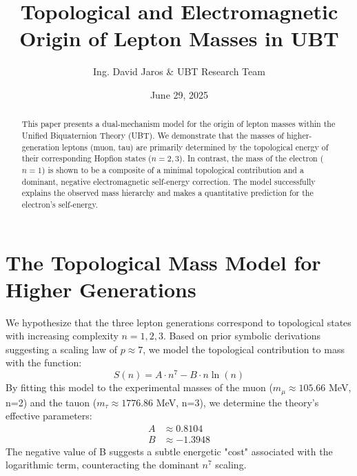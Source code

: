 \documentclass[12pt, a4paper]{article}
\title{\textbf{Topological and Electromagnetic Origin of Lepton Masses in UBT}}
\author{Ing. David Jaros & UBT Research Team}
\date{June 29, 2025}
\begin{document}
\maketitle

\begin{abstract}
This paper presents a dual-mechanism model for the origin of lepton masses within the Unified Biquaternion Theory (UBT). We demonstrate that the masses of higher-generation leptons (muon, tau) are primarily determined by the topological energy of their corresponding Hopfion states (\(n=2, 3\)). In contrast, the mass of the electron (\(n=1\)) is shown to be a composite of a minimal topological contribution and a dominant, negative electromagnetic self-energy correction. The model successfully explains the observed mass hierarchy and makes a quantitative prediction for the electron's self-energy.
\end{abstract}

\section{The Topological Mass Model for Higher Generations}
We hypothesize that the three lepton generations correspond to topological states with increasing complexity \(n=1, 2, 3\). Based on prior symbolic derivations suggesting a scaling law of \(p \approx 7\), we model the topological contribution to mass with the function:
\begin{equation}
    S(n) = A \cdot n^7 - B \cdot n \ln(n)
\end{equation}
By fitting this model to the experimental masses of the muon (\(m_\mu \approx 105.66\) MeV, n=2) and the tauon (\(m_\tau \approx 1776.86\) MeV, n=3), we determine the theory's effective parameters:
\begin{align}
    A &\approx 0.8104 \\
    B &\approx -1.3948
\end{align}
The negative value of B suggests a subtle energetic "cost" associated with the logarithmic term, counteracting the dominant \(n^7\) scaling.
\end{document}
